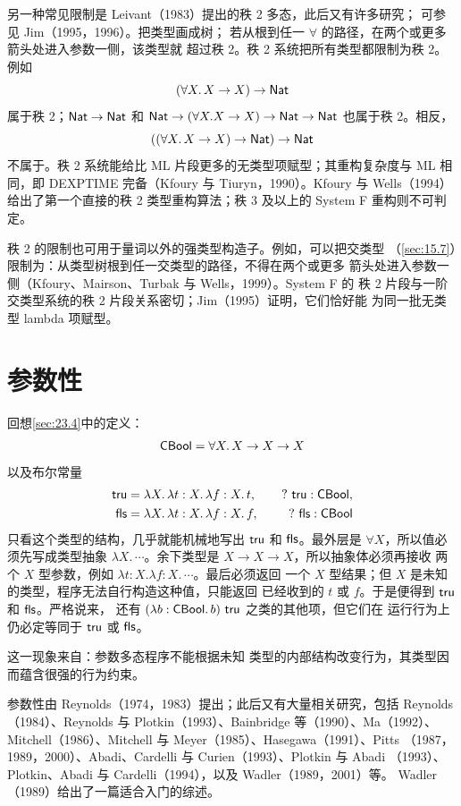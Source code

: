 另一种常见限制是 Leivant（1983）提出的秩 2 多态，此后又有许多研究；
可参见 Jim（1995，1996）。把类型画成树；
若从根到任一 \(\forall\) 的路径，在两个或更多箭头处进入参数一侧，该类型就
超过秩 2。秩 2 系统把所有类型都限制为秩 2。例如
\[
(\forall X.\,X\to X)\to\mathsf{Nat}
\]
属于秩 2；\(\mathsf{Nat}\to\mathsf{Nat}\) 和
\(\mathsf{Nat}\to(\forall X.X\to X)\to\mathsf{Nat}\to\mathsf{Nat}\)
也属于秩 2。相反，
\[
((\forall X.\,X\to X)\to\mathsf{Nat})\to\mathsf{Nat}
\]
不属于。秩 2 系统能给比 ML 片段更多的无类型项赋型；其重构复杂度与 ML
相同，即 DEXPTIME 完备（Kfoury 与 Tiuryn，1990）。Kfoury 与 Wells（1994）
给出了第一个直接的秩 2 类型重构算法；秩 3 及以上的 System F 重构则不可判定。

秩 2 的限制也可用于量词以外的强类型构造子。例如，可以把交类型
（\cref{sec:15.7}）限制为：从类型树根到任一交类型的路径，不得在两个或更多
箭头处进入参数一侧（Kfoury、Mairson、Turbak 与 Wells，1999）。System F 的
秩 2 片段与一阶交类型系统的秩 2 片段关系密切；Jim（1995）证明，它们恰好能
为同一批无类型 lambda 项赋型。

\section{参数性}
\label{sec:23.9}

回想\cref{sec:23.4}中的定义：
\[
\mathsf{CBool}=\forall X.\,X\to X\to X
\]
以及布尔常量
\[
\begin{aligned}
\mathsf{tru}&=\lambda X.\,\lambda t:X.\,\lambda f:X.\,t,
&\quad ?\ \mathsf{tru}:\mathsf{CBool},\\
\mathsf{fls}&=\lambda X.\,\lambda t:X.\,\lambda f:X.\,f,
&\quad ?\ \mathsf{fls}:\mathsf{CBool}
\end{aligned}
\]
只看这个类型的结构，几乎就能机械地写出 \(\mathsf{tru}\) 和
\(\mathsf{fls}\)。最外层是 \(\forall X\)，所以值必须先写成类型抽象
\(\lambda X.\,\cdots\)。余下类型是 \(X\to X\to X\)，所以抽象体必须再接收
两个 \(X\) 型参数，例如 \(\lambda t:X.\lambda f:X.\,\cdots\)。最后必须返回
一个 \(X\) 型结果；但 \(X\) 是未知的类型，程序无法自行构造这种值，只能返回
已经收到的 \(t\) 或 \(f\)。于是便得到 \(\mathsf{tru}\) 和
\(\mathsf{fls}\)。严格说来， 还有
\((\lambda b:\tapltype{CBool}.\,b)\ \taplterm{tru}\) 之类的其他项，但它们在
运行行为上仍必定等同于 \(\mathsf{tru}\) 或 \(\mathsf{fls}\)。

这一现象来自：参数多态程序不能根据未知
类型的内部结构改变行为，其类型因而蕴含很强的行为约束。

参数性由 Reynolds（1974，1983）提出；此后又有大量相关研究，包括 Reynolds
（1984）、Reynolds 与 Plotkin（1993）、Bainbridge 等（1990）、Ma（1992）、
Mitchell（1986）、Mitchell 与 Meyer（1985）、Hasegawa（1991）、Pitts
（1987，1989，2000）、Abadi、Cardelli 与 Curien（1993）、Plotkin 与 Abadi
（1993）、Plotkin、Abadi 与 Cardelli（1994），以及 Wadler（1989，2001）等。
Wadler（1989）给出了一篇适合入门的综述。

